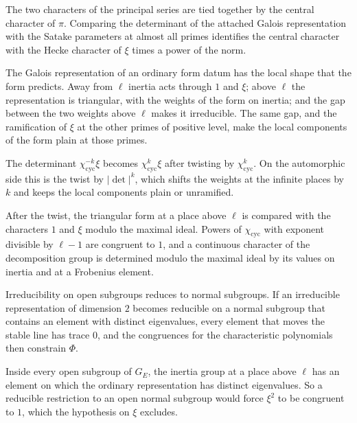 The two characters of the principal series are tied together by the central character of $\pi$. Comparing the determinant of the attached Galois representation with the Satake parameters at almost all primes identifies the central character with the Hecke character of $\xi$ times a power of the norm.

The Galois representation of an ordinary form datum has the local shape that the form predicts. Away from $\ell$ inertia acts through $1$ and $\xi$; above $\ell$ the representation is triangular, with the weights of the form on inertia; and the gap between the two weights above $\ell$ makes it irreducible. The same gap, and the ramification of $\xi$ at the other primes of positive level, make the local components of the form plain at those primes.

The determinant $\chi_{\mathrm{cyc}}^{-k}\xi$ becomes $\chi_{\mathrm{cyc}}^k\xi$ after twisting by $\chi_{\mathrm{cyc}}^k$. On the automorphic side this is the twist by $|\det|^k$, which shifts the weights at the infinite places by $k$ and keeps the local components plain or unramified.

After the twist, the triangular form at a place above $\ell$ is compared with the characters $1$ and $\xi$ modulo the maximal ideal. Powers of $\chi_{\mathrm{cyc}}$ with exponent divisible by $\ell-1$ are congruent to $1$, and a continuous character of the decomposition group is determined modulo the maximal ideal by its values on inertia and at a Frobenius element.

Irreducibility on open subgroups reduces to normal subgroups. If an irreducible representation of dimension $2$ becomes reducible on a normal subgroup that contains an element with distinct eigenvalues, every element that moves the stable line has trace $0$, and the congruences for the characteristic polynomials then constrain $\Phi$.

Inside every open subgroup of $G_E$, the inertia group at a place above $\ell$ has an element on which the ordinary representation has distinct eigenvalues. So a reducible restriction to an open normal subgroup would force $\xi^2$ to be congruent to $1$, which the hypothesis on $\xi$ excludes.

